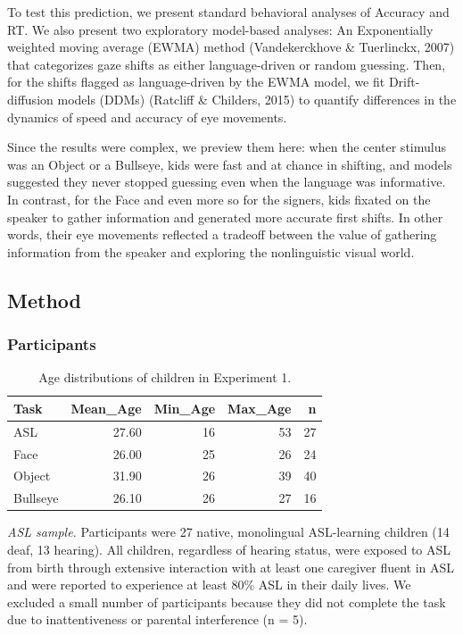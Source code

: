 \documentclass[10pt, letterpaper]{article}
\begin{document}
To test this prediction, we present standard behavioral analyses of
Accuracy and RT. We also present two exploratory model-based analyses:
An Exponentially weighted moving average (EWMA) method (Vandekerckhove
\& Tuerlinckx, 2007) that categorizes gaze shifts as either
language-driven or random guessing. Then, for the shifts flagged as
language-driven by the EWMA model, we fit Drift-diffusion models (DDMs)
(Ratcliff \& Childers, 2015) to quantify differences in the dynamics of
speed and accuracy of eye movements.

Since the results were complex, we preview them here: when the center
stimulus was an Object or a Bullseye, kids were fast and at chance in
shifting, and models suggested they never stopped guessing even when the
language was informative. In contrast, for the Face and even more so for
the signers, kids fixated on the speaker to gather information and
generated more accurate first shifts. In other words, their eye
movements reflected a tradeoff between the value of gathering
information from the speaker and exploring the nonlinguistic visual
world.

\subsection{Method}\label{method}

\subsubsection{Participants}\label{participants}

\begin{table}[b]
\centering
\begin{tabular}{lrrrr}
  \hline
Task & Mean\_Age & Min\_Age & Max\_Age & n \\ 
  \hline
ASL & 27.60 &  16 &  53 &  27 \\ 
  Face & 26.00 &  25 &  26 &  24 \\ 
  Object & 31.90 &  26 &  39 &  40 \\ 
  Bullseye & 26.10 &  26 &  27 &  16 \\ 
   \hline
\end{tabular}
\caption{Age distributions of children in Experiment 1.} 
\end{table}

\emph{ASL sample.} Participants were 27 native, monolingual ASL-learning
children (14 deaf, 13 hearing). All children, regardless of hearing
status, were exposed to ASL from birth through extensive interaction
with at least one caregiver fluent in ASL and were reported to
experience at least 80\% ASL in their daily lives. We excluded a small
number of participants because they did not complete the task due to
inattentiveness or parental interference (n = 5).
\end{document}
